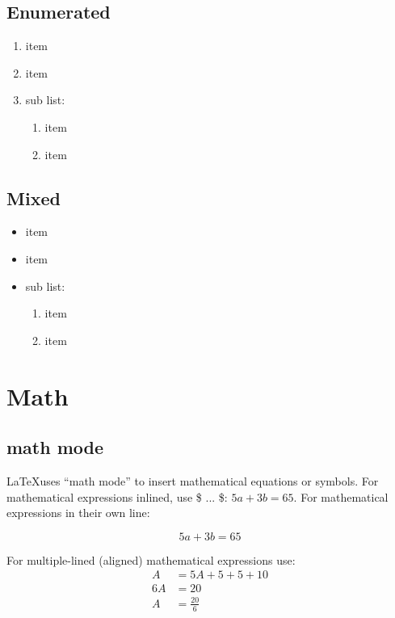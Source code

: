 \documentclass[12pt]{article}
\begin{document}
  \subsection{Enumerated}

    \begin{enumerate}
      \item item
      \item item
      \item sub list:
      \begin{enumerate}
        \item item
        \item item
      \end{enumerate}
    \end{enumerate}

  \subsection{Mixed}

    \begin{itemize}
      \item item
      \item item
      \item sub list:
      \begin{enumerate}
        \item item
        \item item
      \end{enumerate}
    \end{itemize}

  \section{Math}

  \subsection{math mode}

  \LaTeX uses ``math mode'' to insert mathematical equations or symbols. For mathematical expressions inlined, use \$ ... \$: $5a + 3b = 65$. For mathematical expressions in their own line:

  \[ 5a + 3b = 65 \]

  For multiple-lined (aligned) mathematical expressions use:\\
  \begin{align*}
    A &= 5A + 5 + 5 + 10 \\
    6A &= 20 \\
    A &= \frac{20}{6}
  \end{align*}
\end{document}
